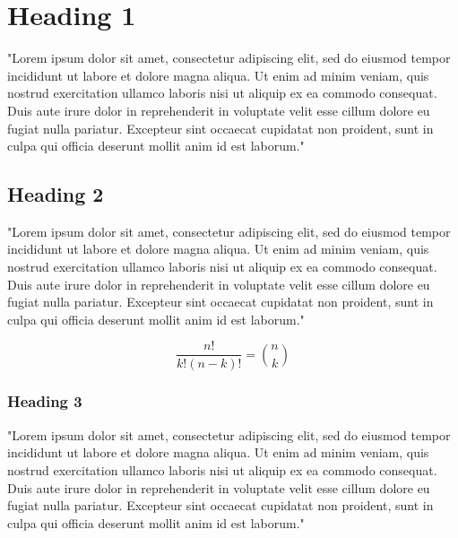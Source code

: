 \documentclass[a4paper,11pt]{article}
\begin{document}
\section{Heading 1}
"Lorem ipsum dolor sit amet, consectetur adipiscing elit, sed do eiusmod tempor
incididunt ut labore et dolore magna aliqua. Ut enim ad minim veniam, quis
nostrud exercitation ullamco laboris nisi ut aliquip ex ea commodo consequat.
Duis aute irure dolor in reprehenderit in voluptate velit esse cillum dolore eu
fugiat nulla pariatur. Excepteur sint occaecat cupidatat non proident, sunt in
culpa qui officia deserunt mollit anim id est laborum."

\subsection{Heading 2}
"Lorem ipsum dolor sit amet, consectetur adipiscing elit, sed do eiusmod tempor
incididunt ut labore et dolore magna aliqua. Ut enim ad minim veniam, quis
nostrud exercitation ullamco laboris nisi ut aliquip ex ea commodo consequat.
Duis aute irure dolor in reprehenderit in voluptate velit esse cillum dolore eu
fugiat nulla pariatur. Excepteur sint occaecat cupidatat non proident, sunt in
culpa qui officia deserunt mollit anim id est laborum."

$$
\frac{n!}{k!(n-k)!} = \binom{n}{k}
$$

\subsubsection{Heading 3}
"Lorem ipsum dolor sit amet, consectetur adipiscing elit, sed do eiusmod tempor
incididunt ut labore et dolore magna aliqua. Ut enim ad minim veniam, quis
nostrud exercitation ullamco laboris nisi ut aliquip ex ea commodo consequat.
Duis aute irure dolor in reprehenderit in voluptate velit esse cillum dolore eu
fugiat nulla pariatur. Excepteur sint occaecat cupidatat non proident, sunt in
culpa qui officia deserunt mollit anim id est laborum."

%
%
\end{document}
